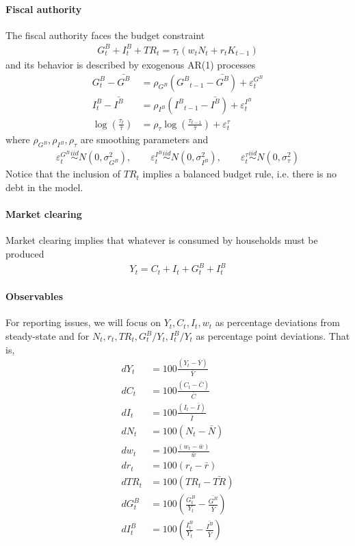 \documentclass{article}
\begin{document}
\paragraph*{Fiscal authority}
The fiscal authority faces the budget constraint
\begin{align}
  G_t^B + I_t^B + TR_t = \tau_t(w_t N_t + r_t K_{t-1})
\end{align}
and its behavior is described by exogenous AR(1) processes
\begin{align}
  G^B_t-\bar{G^B} &= \rho_{G^B} \left({G^B}_{t-1} - \bar{G^B}\right) +  \varepsilon_t^{G^B}\\
  I^B_t-\bar{I^B} &= \rho_{I^B} \left({I^B}_{t-1} - \bar{I^B}\right) +  \varepsilon_t^{I^B}\\
  \log\left(\frac{\tau_t}{\bar{\tau}}\right) &= \rho_\tau \log\left(\frac{\tau_{t-1}}{\bar{\tau}}\right) +  \varepsilon_t^\tau
\end{align}
where $\rho_{G^B}, \rho_{I^B}, \rho_{\tau}$ are smoothing parameters and
\begin{align*}
\varepsilon_t^{G^B}\overset{iid}{\sim} N(0,\sigma_{G^B}^2), \qquad
\varepsilon_t^{I^B}\overset{iid}{\sim} N(0,\sigma_{I^B}^2), \qquad
\varepsilon_t^\tau\overset{iid}{\sim} N(0,\sigma_{\tau}^2)
\end{align*}
Notice that the inclusion of $TR_t$ implies a balanced budget rule, i.e. there is no debt in the model.
\paragraph*{Market clearing}
Market clearing implies that whatever is consumed by households must be produced
\begin{align}
  Y_t = C_t + I_t + G_t^B + I_t^B
\end{align}
\paragraph{Observables}
For reporting issues, we will focus on $Y_t,C_t,I_t, w_t$ as percentage deviations from steady-state and for $N_t,r_t,TR_t,G^B_t/Y_t,I^B_t/Y_t$ as percentage point deviations. That is,
\begin{align}
dY_{t}&=100\frac{\left(Y_{t}-\bar{Y}\right)}{\bar{Y}}\\
dC_{t}&=100\frac{\left(C_{t}-\bar{C}\right)}{\bar{C}}\\
dI_{t}&=100\frac{\left(I_{t}-\bar{I}\right)}{\bar{I}}\\
dN_{t}&=100\left(N_{t}-\bar{N}\right)\\
dw_{t}&=100\frac{\left(w_{t}-\bar{w}\right)}{\bar{w}}\\
dr_{t}&=100\left(r_{t}-\bar{r}\right)\\
dTR_{t}&=100\left(TR_{t}-\bar{TR}\right)\\
dG^B_{t}&=100\left(\frac{G^B_{t}}{Y_{t}}-\frac{\bar{G^B}}{\bar{Y}}\right)\\
dI^B_{t}&=100\left(\frac{I^B_{t}}{Y_{t}}-\frac{\bar{I^B}}{\bar{Y}}\right)
\end{align}
\end{document}

